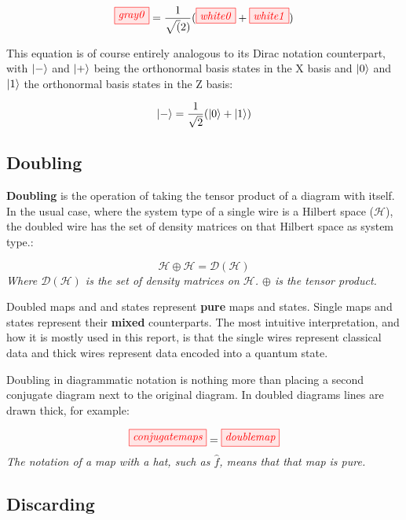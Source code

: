 \documentclass[]{article}
\begin{document}
\begin{equation}
\tikzfig{gray0} =\frac{1}{\sqrt(2)}( \tikzfig{white0} + \tikzfig{white1})
\end{equation}

This equation is of course entirely analogous to its Dirac notation counterpart, with $\ket{-}$ and $\ket{+}$ being the orthonormal basis states in the X basis and $\ket{0}$ and $\ket{1}$ the orthonormal basis states in the Z basis:

\begin{equation}
\ket{-} = \frac{1}{\sqrt{2}}(\ket{0} + \ket{1})
\end{equation}

\subsection{Doubling}
\label{doubling}

\textbf{Doubling} is the operation of taking the tensor product of a diagram with itself. In the usual case, where the system type of a single wire is a Hilbert space ($\mathcal{H}$), the doubled wire has the set of density matrices on that Hilbert space as system type.:

\begin{equation}
\mathcal{H} \oplus \mathcal{H} = \mathcal{D}(\mathcal{H})
\end{equation}
\textit{Where $\mathcal{D}(\mathcal{H})$ is the set of density matrices on $\mathcal{H}$. $\oplus$ is the tensor product.}

Doubled maps and and states represent \textbf{pure} maps and states. Single maps and states represent their \textbf{mixed} counterparts. The most intuitive interpretation, and how it is mostly used in this report, is that the single wires represent classical data and thick wires represent data encoded into a quantum state.

Doubling in diagrammatic notation is nothing more than placing a second conjugate diagram next to the original diagram. In doubled diagrams lines are drawn thick, for example:

\begin{equation}
\tikzfig{conjugatemaps} = \tikzfig{doublemap}
\end{equation}
\textit{The notation of a map with a hat, such as $\hat{f}$, means that that map is pure.}


\subsection{Discarding}
\label{discarding}
\end{document}
